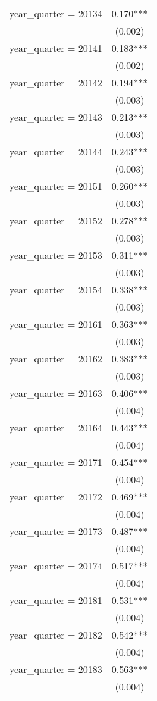 \begin{tabular}{lc}
year\_quarter = 20134 & 0.170*** \\
 & (0.002) \\
year\_quarter = 20141 & 0.183*** \\
 & (0.002) \\
year\_quarter = 20142 & 0.194*** \\
 & (0.003) \\
year\_quarter = 20143 & 0.213*** \\
 & (0.003) \\
year\_quarter = 20144 & 0.243*** \\
 & (0.003) \\
year\_quarter = 20151 & 0.260*** \\
 & (0.003) \\
year\_quarter = 20152 & 0.278*** \\
 & (0.003) \\
year\_quarter = 20153 & 0.311*** \\
 & (0.003) \\
year\_quarter = 20154 & 0.338*** \\
 & (0.003) \\
year\_quarter = 20161 & 0.363*** \\
 & (0.003) \\
year\_quarter = 20162 & 0.383*** \\
 & (0.003) \\
year\_quarter = 20163 & 0.406*** \\
 & (0.004) \\
year\_quarter = 20164 & 0.443*** \\
 & (0.004) \\
year\_quarter = 20171 & 0.454*** \\
 & (0.004) \\
year\_quarter = 20172 & 0.469*** \\
 & (0.004) \\
year\_quarter = 20173 & 0.487*** \\
 & (0.004) \\
year\_quarter = 20174 & 0.517*** \\
 & (0.004) \\
year\_quarter = 20181 & 0.531*** \\
 & (0.004) \\
year\_quarter = 20182 & 0.542*** \\
 & (0.004) \\
year\_quarter = 20183 & 0.563*** \\
 & (0.004) \\

\end{tabular}
